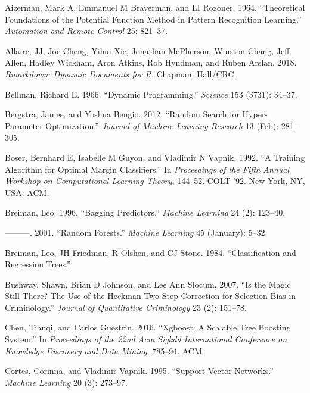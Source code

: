 \documentclass[
  11pt,
  a4paper,
  DIV=12,captions=tableheading,oneside,titlepage]{scrbook}
\begin{document}
\hypertarget{refs}{}
\leavevmode\hypertarget{ref-aizerman1964theoretical}{}%
Aizerman, Mark A, Emmanuel M Braverman, and LI Rozoner. 1964. ``Theoretical Foundations of the Potential Function Method in Pattern Recognition Learning.'' \emph{Automation and Remote Control} 25: 821--37.

\leavevmode\hypertarget{ref-allaire2016rmarkdown}{}%
Allaire, JJ, Joe Cheng, Yihui Xie, Jonathan McPherson, Winston Chang, Jeff Allen, Hadley Wickham, Aron Atkins, Rob Hyndman, and Ruben Arslan. 2018. \emph{Rmarkdown: Dynamic Documents for R}. Chapman; Hall/CRC.

\leavevmode\hypertarget{ref-bellman1966dynamic}{}%
Bellman, Richard E. 1966. ``Dynamic Programming.'' \emph{Science} 153 (3731): 34--37.

\leavevmode\hypertarget{ref-bergstra2012random}{}%
Bergstra, James, and Yoshua Bengio. 2012. ``Random Search for Hyper-Parameter Optimization.'' \emph{Journal of Machine Learning Research} 13 (Feb): 281--305.

\leavevmode\hypertarget{ref-boser1992svc}{}%
Boser, Bernhard E, Isabelle M Guyon, and Vladimir N Vapnik. 1992. ``A Training Algorithm for Optimal Margin Classifiers.'' In \emph{Proceedings of the Fifth Annual Workshop on Computational Learning Theory}, 144--52. COLT '92. New York, NY, USA: ACM.

\leavevmode\hypertarget{ref-breiman1996bagging}{}%
Breiman, Leo. 1996. ``Bagging Predictors.'' \emph{Machine Learning} 24 (2): 123--40.

\leavevmode\hypertarget{ref-breiman2001rf}{}%
---------. 2001. ``Random Forests.'' \emph{Machine Learning} 45 (January): 5--32.

\leavevmode\hypertarget{ref-breiman1984classification}{}%
Breiman, Leo, JH Friedman, R Olshen, and CJ Stone. 1984. ``Classification and Regression Trees.''

\leavevmode\hypertarget{ref-bushway2007magic}{}%
Bushway, Shawn, Brian D Johnson, and Lee Ann Slocum. 2007. ``Is the Magic Still There? The Use of the Heckman Two-Step Correction for Selection Bias in Criminology.'' \emph{Journal of Quantitative Criminology} 23 (2): 151--78.

\leavevmode\hypertarget{ref-chen2016xgboost}{}%
Chen, Tianqi, and Carlos Guestrin. 2016. ``Xgboost: A Scalable Tree Boosting System.'' In \emph{Proceedings of the 22nd Acm Sigkdd International Conference on Knowledge Discovery and Data Mining}, 785--94. ACM.

\leavevmode\hypertarget{ref-cortes1995support}{}%
Cortes, Corinna, and Vladimir Vapnik. 1995. ``Support-Vector Networks.'' \emph{Machine Learning} 20 (3): 273--97.
\end{document}
